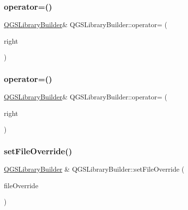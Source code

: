 \subsubsection{\texorpdfstring{operator=()}{operator=()}\hspace{0.1cm}{\footnotesize\ttfamily [1/2]}}
{\footnotesize\ttfamily \mbox{\hyperlink{class_q_g_s_library_builder}{Q\+G\+S\+Library\+Builder}}\& Q\+G\+S\+Library\+Builder\+::operator= (\begin{DoxyParamCaption}\item[{const \mbox{\hyperlink{class_q_g_s_library_builder}{Q\+G\+S\+Library\+Builder}} \&}]{right }\end{DoxyParamCaption})\hspace{0.3cm}{\ttfamily [delete]}}

\mbox{\label{class_q_g_s_library_builder_a14048ca986d1a6444882b1c9e10eceea}} 
\subsubsection{\texorpdfstring{operator=()}{operator=()}\hspace{0.1cm}{\footnotesize\ttfamily [2/2]}}
{\footnotesize\ttfamily \mbox{\hyperlink{class_q_g_s_library_builder}{Q\+G\+S\+Library\+Builder}}\& Q\+G\+S\+Library\+Builder\+::operator= (\begin{DoxyParamCaption}\item[{\mbox{\hyperlink{class_q_g_s_library_builder}{Q\+G\+S\+Library\+Builder}} \&\&}]{right }\end{DoxyParamCaption})\hspace{0.3cm}{\ttfamily [delete]}}

\mbox{\label{class_q_g_s_library_builder_a752a429b619cd207f898c3ec331d922f}} 
\subsubsection{\texorpdfstring{set\+File\+Override()}{setFileOverride()}}
{\footnotesize\ttfamily \mbox{\hyperlink{class_q_g_s_library_builder}{Q\+G\+S\+Library\+Builder}} \& Q\+G\+S\+Library\+Builder\+::set\+File\+Override (\begin{DoxyParamCaption}\item[{const bool}]{file\+Override }\end{DoxyParamCaption})}

